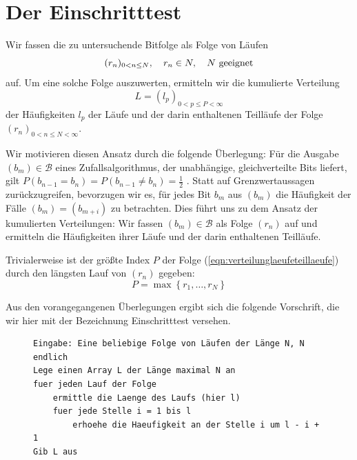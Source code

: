 \documentclass[11pt,a4paper]{scrartcl}
\theoremstyle{plain}
\theoremstyle{definition}
\theoremstyle{remark}
\begin{document}
\section{Der Einschritttest}\label{sec:einschritttest}

Wir fassen die zu untersuchende Bitfolge als Folge von Läufen
\begin{equation}\label{eqn:laeuflangefolge}
  (r_n)_{0<n\leq N},\quad r_n\in\mathcal \mathbb N,\quad N\text{ geeignet}
\end{equation}
auf. Um eine solche Folge auszuwerten, ermitteln wir die kumulierte
Verteilung
\begin{equation}\label{eqn:verteilunglaeufeteillaeufe}
  L=(l_p)_{0<p\leq P<\infty}
\end{equation}
der Häufigkeiten $l_p$ der Läufe und der darin enthaltenen Teilläufe der
Folge $(r_n)_{0<n\leq N<\infty}$.

Wir motivieren diesen Ansatz durch die folgende Überlegung: Für die
Ausgabe $(b_m)\in \mathcal B$ eines Zufallsalgorithmus, der unabhängige,
gleichverteilte Bits liefert, gilt
$P(b_{n-1}=b_n)=P(b_{n-1}\neq b_n)=\tfrac{1}{2}$ \cite{feller1968}.
Statt auf Grenzwertaussagen zurückzugreifen, bevorzugen wir es, für
jedes Bit $b_m$ aus $(b_m)$ die Häufigkeit der Fälle
$(b_{m})=(b_{m+i})$ zu betrachten. Dies führt uns zu dem Ansatz der
kumulierten Verteilungen: Wir fassen $(b_m)\in\mathcal B$ als Folge
$(r_n)$ auf und ermitteln die Häufigkeiten ihrer Läufe und
der darin enthaltenen Teilläufe.

Trivialerweise ist der größte Index $P$ der Folge
(\ref{eqn:verteilunglaeufeteillaeufe}) durch den längsten Lauf von
$(r_n)$ gegeben:
\begin{equation}\label{eqn:maximalelaengevonl}
  P=\max\left\{ r_1,\dots, r_N\right\}
\end{equation}

\noindent Aus den vorangegangenen Überlegungen ergibt sich die folgende
Vorschrift, die wir hier mit der Bezeichnung Einschritttest versehen.

\begin{figure}[htbp]
\begin{lstlisting}[caption={Einschritttest für Folgen von Läufen},label={algo:einschritt-laeufe}]
Eingabe: Eine beliebige Folge von Läufen der Länge N, N endlich
Lege einen Array L der Länge maximal N an
fuer jeden Lauf der Folge
    ermittle die Laenge des Laufs (hier l)
    fuer jede Stelle i = 1 bis l
        erhoehe die Haeufigkeit an der Stelle i um l - i + 1
Gib L aus
\end{lstlisting}
\end{figure}
\end{document}
